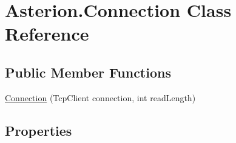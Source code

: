 \hypertarget{classAsterion_1_1Connection}{\section{Asterion.\-Connection Class Reference}
\label{classAsterion_1_1Connection}
}
\subsection*{Public Member Functions}
\begin{DoxyCompactItemize}
\item 
\hyperlink{classAsterion_1_1Connection_a64ddc624e776dc54e75505ff877cc2c1}{Connection} (Tcp\-Client connection, int read\-Length)
\end{DoxyCompactItemize}
\subsection*{Properties}
